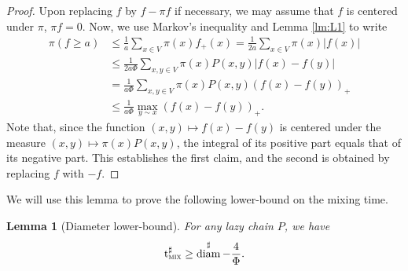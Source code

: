 \documentclass[10pt]{amsart}
\newtheorem{lemma}{Lemma}
\theoremstyle{definition}
\newcommand{\tmix}{\mathrm{t}_{\textup{\textsc{mix}}}}
\DeclareMathOperator{\diam}{diam}
\begin{document}
\begin{proof}
Upon replacing $f$ by $f-\pi f$ if necessary, we may assume that $f$ is centered under $\pi$, \ie $\pi f=0$. Now, we use Markov's inequality and Lemma \ref{lm:L1} to write
\begin{align*}
\pi\left(f\ge a\right) & \le \frac{1}{a}\sum_{x\in V}\pi(x)f_+(x) = \frac{1}{2a}\sum_{x\in V}\pi(x)|f(x)|\\
& \le \frac{1}{2a\Phi}\sum_{x,y\in V}\pi(x)P(x,y)\left|f(x)-f(y)\right|\\
& = \frac{1}{a\Phi}\sum_{x,y\in V}\pi(x)P(x,y)\left(f(x)-f(y)\right)_+\\
& \le \frac{1}{a\Phi}\max_{y\sim x}(f(x)-f(y))_+.
\end{align*}
Note that, since the function $(x,y)\mapsto f(x)-f(y)$ is centered under the measure $(x,y)\mapsto \pi(x)P(x,y)$, the integral of its positive part equals that of its negative part. This establishes the first claim, and the second is obtained by replacing $f$ with $-f$.
\end{proof}
We will use this lemma to prove the following lower-bound on the mixing time.
\begin{lemma}[Diameter lower-bound]\label{lm:diam}For any lazy chain $P$, we have
\[
\tmix^\sharp \ge \diam^\sharp-\frac{4}{\Phi}.
\]
\end{lemma}
\end{document}
